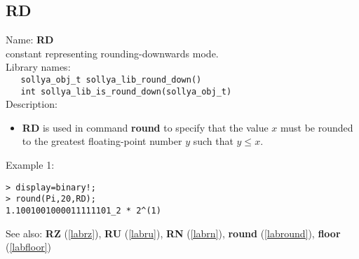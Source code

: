 \subsection{RD}
\label{labrd}
\noindent Name: \textbf{RD}\\
\phantom{aaa}constant representing rounding-downwards mode.\\[0.2cm]
\noindent Library names:\\
\verb|   sollya_obj_t sollya_lib_round_down()|\\
\verb|   int sollya_lib_is_round_down(sollya_obj_t)|\\[0.2cm]
\noindent Description: \begin{itemize}

\item \textbf{RD} is used in command \textbf{round} to specify that the value $x$ must be rounded
   to the greatest floating-point number $y$ such that $y \le x$.
\end{itemize}
\noindent Example 1: 
\begin{center}\begin{minipage}{15cm}\begin{Verbatim}[frame=single,commandchars=\\\|\~]
> display=binary!;
> round(Pi,20,RD);
1.1001001000011111101_2 * 2^(1)
\end{Verbatim}
\end{minipage}\end{center}
See also: \textbf{RZ} (\ref{labrz}), \textbf{RU} (\ref{labru}), \textbf{RN} (\ref{labrn}), \textbf{round} (\ref{labround}), \textbf{floor} (\ref{labfloor})
